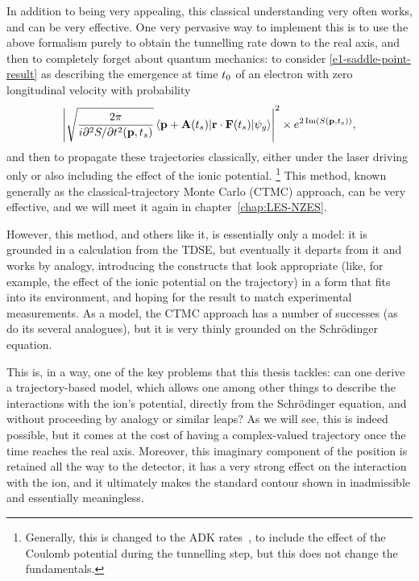 In addition to being very appealing, this classical understanding very often works, and can be very effective. One very pervasive way to implement this is to use the above formalism purely to obtain the tunnelling rate down to the real axis, and then to completely forget about quantum mechanics: to consider \eqref{e1-saddle-point-result} as describing the emergence at time ${t_0}$ of an electron with zero longitudinal velocity with probability
\begin{equation}
\left|
\sqrt{\frac{2\pi}{i\partial^2 S/\partial t^2(\vbp,\ts)}}
\matrixel{\vbp+\vba(\ts)}{\vbr\cdot\vbf(\ts)}{\psi_g}
\right|^2
\times
e^{2\Im\left(S(\vbp,\ts)\right)} 
,
\end{equation}
and then to propagate these trajectories classically, either under the laser driving only or also including the effect of the ionic potential.%
\footnote{%
Generally, this is changed to the ADK rates~\cite{ammosov-delone-krainov-1986}, to include the effect of the Coulomb potential during the tunnelling step, but this does not change the fundamentals.
}
This method, known generally as the classical-trajectory Monte Carlo (CTMC) approach, can be very effective, and we will meet it again in chapter~\ref{chap:LES-NZES}.

However, this method, and others like it, is essentially only a model: it is grounded in a calculation from the TDSE, but eventually it departs from it and works by analogy, introducing the constructs that look appropriate (like, for example, the effect of the ionic potential on the trajectory) in a form that fits into its environment, and hoping for the result to match experimental measurements. As a model, the CTMC approach has a number of successes (as do its several analogues), but it is very thinly grounded on the Schrödinger equation. 

This is, in a way, one of the key problems that this thesis tackles: can one derive a trajectory-based model, which allows one among other things to describe the interactions with the ion's potential, directly from the Schrödinger equation, and without proceeding by analogy or similar leaps? As we will see, this is indeed possible, but it comes at the cost of having a complex-valued trajectory once the time reaches the real axis. Moreover, this imaginary component of the position is retained all the way to the detector, it has a very strong effect on the interaction with the ion, and it ultimately makes the standard contour shown in  inadmissible and essentially meaningless. 

